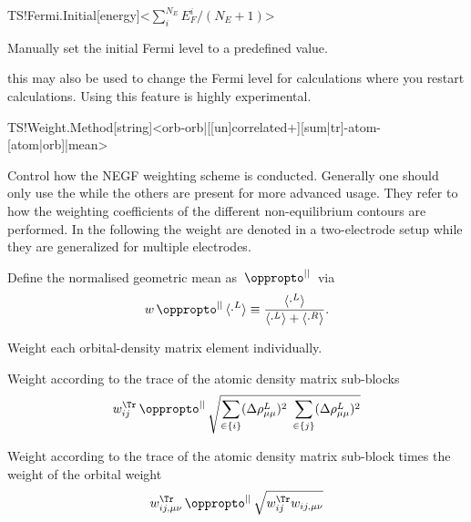 \begin{fdfentry}{TS!Fermi.Initial}[energy]<$\sum^{N_E}_iE_F^i/(N_E+1)$>

  Manually set the initial Fermi level to a predefined value. 

  \note this may also be used to change the Fermi level for calculations where you restart
  calculations. Using this feature is highly experimental.
  
\end{fdfentry}

\begin{fdfentry}{TS!Weight.Method}[string]<orb-orb|[[un]correlated+][sum|tr]-atom-[atom|orb]|mean>
  
  Control how the NEGF weighting scheme is conducted. Generally one
  should only use the  while the others are present for
  more advanced usage. They refer to how the weighting coefficients of
  the different non-equilibrium contours are performed. In the
  following the weight are denoted in a two-electrode setup while they
  are generalized for multiple electrodes.

  \def\mypropto{\,\oppropto^{||}\,} %
  \def\mn{{\mu\nu}} %
  Define the normalised geometric mean as $\mypropto$ via
  \begin{equation}
    w\mypropto \langle\cdot^L\rangle\equiv
    \frac{\langle\cdot^L\rangle}{\langle\cdot^L\rangle+\langle\cdot^R\rangle}.
  \end{equation}


  \begin{fdfoptions}

    Weight each orbital-density matrix element individually.

    Weight according to the trace of the atomic density matrix sub-blocks
    \begin{equation}
      w_{ij}^{\Tr} \mypropto
      \sqrt{
          \sum_{\in\{i\}}(\Delta\rho_{\mu\mu}^L)^2
          \; %
          \sum_{\in\{j\}}(\Delta\rho_{\mu\mu}^L)^2
      }
    \end{equation}

    
    Weight according to the trace of the atomic density matrix
    sub-block times the weight of the orbital weight
    \begin{equation}
      w_{ij,\mn}^{\Tr} \mypropto
      \sqrt{
          w_{ij}^{\Tr} 
          w_{ij,\mn}
      }
    \end{equation}


\end{fdfoptions}
\end{fdfentry}
